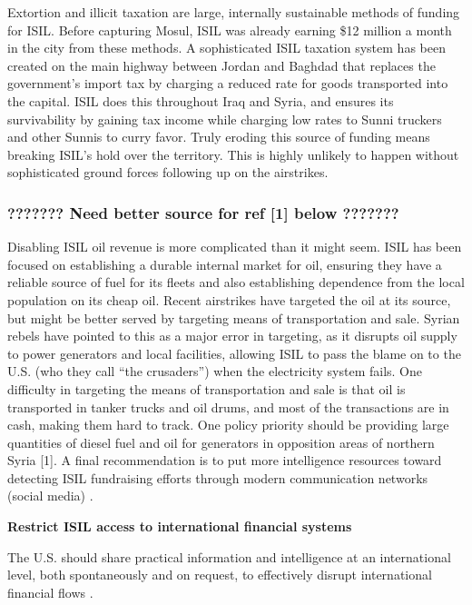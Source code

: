 \documentclass{report}
\begin{document}
Extortion and illicit taxation are large, internally sustainable methods of funding for ISIL. Before capturing Mosul, ISIL was already earning \$12 million a month in the city from these methods. A sophisticated ISIL taxation system has been created on the main highway between Jordan and Baghdad that replaces the government's import tax by charging a reduced rate for goods transported into the capital. ISIL does this throughout Iraq and Syria, and ensures its survivability by gaining tax income while charging low rates to Sunni truckers and other Sunnis to curry favor. Truly eroding this source of funding means breaking ISIL's hold over the territory. This is highly unlikely to happen without sophisticated ground forces following up on the airstrikes. 

\subsubsection{???????  Need better source for ref [1]  below  ???????}


Disabling ISIL oil revenue is more complicated than it might seem. ISIL has been focused on establishing a durable internal market for oil, ensuring they have a reliable source of fuel for its fleets and also establishing dependence from the local population on its cheap oil. Recent airstrikes have targeted the oil at its source, but might be better served by targeting means of transportation and sale. Syrian rebels have pointed to this as a major error in targeting, as it disrupts oil supply to power generators and local facilities, allowing ISIL to pass the blame on to the U.S. (who they call \enquote{the crusaders}) when the electricity system fails. One difficulty in targeting the means of transportation and sale is that oil is transported in tanker trucks and oil drums, and most of the transactions are in cash, making them hard to track. One policy priority should be providing large quantities of diesel fuel and oil for generators in opposition areas of northern Syria [1].
A final recommendation is to put more intelligence resources toward detecting ISIL fundraising efforts through modern communication networks (social media) \cite{Report2015}.

\textbf{Restrict ISIL access to international financial systems}

The U.S. should share practical information and intelligence at an international level, both spontaneously and on request, to effectively disrupt international financial flows \cite{Report2015}.
\end{document}
